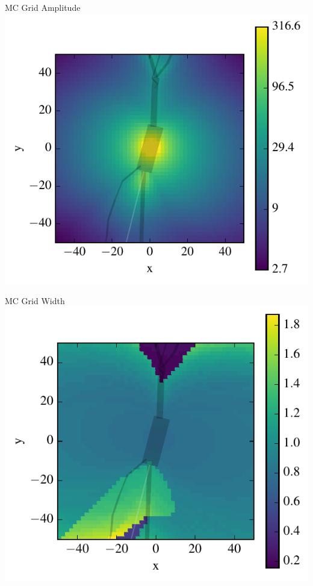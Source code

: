 \documentclass{beamer}
\begin{document}
\begin{frame}{MC Grid Amplitude}{}
    \centering
    \includegraphics[width=.8\textwidth]{images/grid_dense_gradient.pdf}
\end{frame}

\begin{frame}{MC Grid Width}{}
    \centering
    \includegraphics[width=.8\textwidth]{images/grid_dense_width.pdf}
\end{frame}
\end{document}
